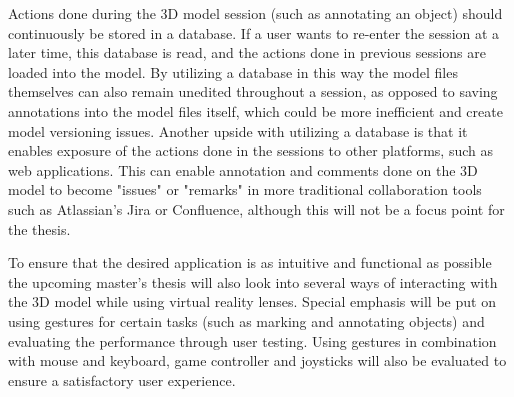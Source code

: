 Actions done during the 3D model session (such as annotating an object) should continuously be stored in a database. If a user wants to re-enter the session at a later time, this database is read, and the actions done in previous sessions are loaded into the model. By utilizing a database 
in this way the model files themselves can also remain unedited throughout a session, as opposed to saving annotations into the model files itself, which could be more inefficient and create model versioning issues. Another upside with utilizing a database is that it enables exposure of the actions done in the sessions to other platforms, such as web applications. This can enable annotation and comments done on the 3D model to become "issues" or "remarks" in more traditional collaboration tools such as Atlassian's Jira or Confluence, although this will not be a focus point for the thesis.  

To ensure that the desired application is as intuitive and functional as possible the upcoming master's thesis will also look into several ways of interacting with the 3D model while using virtual reality lenses. Special emphasis will be put on using gestures for certain tasks (such as marking and annotating objects) and evaluating the performance through user testing. Using gestures in combination with mouse and keyboard, game controller and joysticks will also be evaluated to ensure a satisfactory user experience.     
